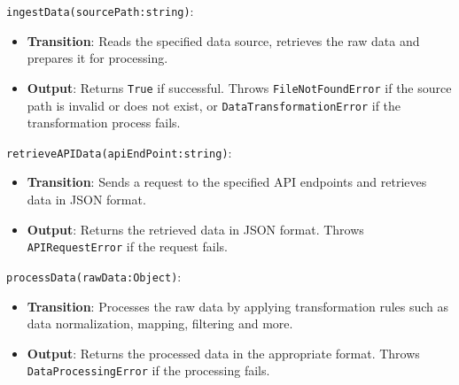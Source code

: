 \documentclass[12pt, titlepage]{article}
\begin{document}
\begin{description}
\begin{description}
  \texttt{ingestData(sourcePath:string)}:
  \item
  \begin{itemize}
    \item \textbf{Transition}: Reads the specified data source, retrieves the raw data and prepares
    it for processing.
  \end{itemize}
  \item
  \begin{itemize}
    \item \textbf{Output}: Returns \texttt{True} if successful. Throws \texttt{FileNotFoundError}
    if the source path is invalid or does not exist, or \texttt{DataTransformationError} if the
    transformation process fails.
  \end{itemize}
  \item

  \texttt{retrieveAPIData(apiEndPoint:string)}:
  \item
  \begin{itemize}
    \item \textbf{Transition}: Sends a request to the specified API endpoints and retrieves data in JSON
    format.
  \end{itemize}
  \item 
  \begin{itemize}
    \item \textbf{Output}: Returns the retrieved data in JSON format. Throws \texttt{APIRequestError} if
    the request fails.
  \end{itemize}
  \item

  \texttt{processData(rawData:Object)}:
  \item
  \begin{itemize}
    \item \textbf{Transition}: Processes the raw data by applying transformation rules such as data
    normalization, mapping, filtering and more.
  \end{itemize}
  \item
  \begin{itemize}
    \item \textbf{Output}: Returns the processed data in the appropriate format. Throws \\
    \texttt{DataProcessingError} if the processing fails.
  \end{itemize}
  \item


\end{description}
\end{description}
\end{document}
